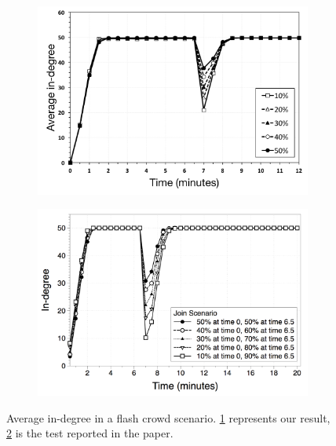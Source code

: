 \begin{figure}
\centering
\begin{subfigure}{.5\textwidth}
  \centering
  \includegraphics[keepaspectratio=true, width=1\linewidth]{images/average_indegree}
  \caption{}
  \label{fig:average_indegree}
\end{subfigure}%
\begin{subfigure}{.5\textwidth}
  \centering
  \includegraphics[keepaspectratio=true, width=1\linewidth]{images/paper_average_indegree}
  \caption{}
  \label{fig:paper_average_indegree}
\end{subfigure}
\caption{Average in-degree in a flash crowd scenario. \ref{fig:average_indegree} represents our result, \ref{fig:paper_average_indegree} is the test reported in the paper.}
\label{fig:robustness_indegree_flash_crowd}
\end{figure}

